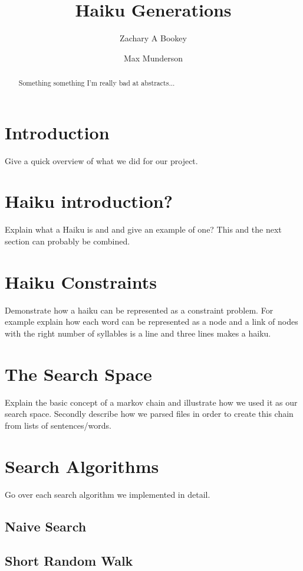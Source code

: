 \documentclass[]{article}
\title{Haiku Generations}
\author{Zachary A Bookey \and Max Munderson}
\begin{document}
\maketitle

\begin{abstract}
Something something I'm really bad at abstracts...
\end{abstract}

\section{Introduction}
Give a quick overview of what we did for our project.

\section{Haiku introduction?}
Explain what a Haiku is and and give an example of one? This and the next section can probably be combined.

\section{Haiku Constraints}
Demonstrate how a haiku can be represented as a constraint problem. For example explain how each word can be represented as a node and a link of nodes with the right number of syllables is a line and three lines makes a haiku.

\section{The Search Space}
Explain the basic concept of a markov chain and illustrate how we used it as our search space. Secondly describe how we parsed files in order to create this chain from lists of sentences/words.

\section{Search Algorithms}
Go over each search algorithm we implemented in detail.
\subsection{Naive Search}

\subsection{Short Random Walk}
\end{document}
